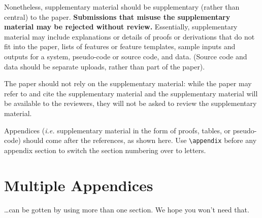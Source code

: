 \documentclass[11pt,a4paper]{article}
\begin{document}
Nonetheless, supplementary material should be supplementary (rather
than central) to the paper. {\bf Submissions that misuse the supplementary 
material may be rejected without review.}
Essentially, supplementary material may include explanations or details
of proofs or derivations that do not fit into the paper, lists of
features or feature templates, sample inputs and outputs for a system,
pseudo-code or source code, and data. (Source code and data should
be separate uploads, rather than part of the paper).

The paper should not rely on the supplementary material: while the paper
may refer to and cite the supplementary material and the supplementary material will be available to the
reviewers, they will not be asked to review the
supplementary material.


Appendices ({\em i.e.} supplementary material in the form of proofs, tables,
or pseudo-code) should come after the references, as shown here. Use
\verb|\appendix| before any appendix section to switch the section
numbering over to letters.

\section{Multiple Appendices}
\dots can be gotten by using more than one section. We hope you won't
need that.
\end{document}
